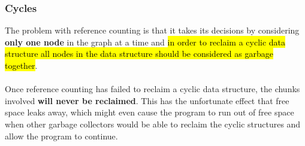 \documentclass[presentation]{beamer}
\makeatletter
\let\HL\hl
\renewcommand\hl{%
  \let\set@color\beamerorig@set@color
  \let\reset@color\beamerorig@reset@color
  \HL}
\makeatother
\begin{document}
\begin{frame}
  \frametitle{Cycles} 
  \justifying
The problem with reference counting is that it takes its decisions by considering
\textbf{only one node} in the graph at a time and \hl{in order to reclaim a cyclic data structure all
nodes in the data structure should be considered as garbage together}. 
\\~\\
\justifying
Once reference counting has failed to reclaim a cyclic data structure, the chunks involved \textbf{will never
be reclaimed}. This has the unfortunate effect that free space leaks away, which might
even cause the program to run out of free space when other garbage collectors would
be able to reclaim the cyclic structures and allow the program to continue.
\\~\\

\end{frame}
\end{document}
